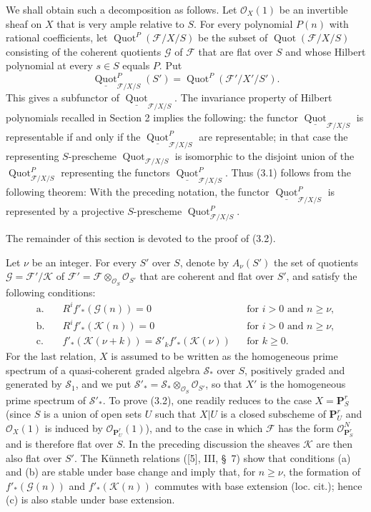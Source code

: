 We shall obtain such a decomposition as follows. Let $\mathcal O_X(1)$ be an
invertible sheaf on $X$ that is very ample relative to $S$. For every
polynomial $P(n)$ with rational coefficients, let
$\operatorname{Quot}^P(\mathcal F/X/S)$ be the subset of
$\operatorname{Quot}(\mathcal F/X/S)$ consisting of the coherent quotients
$\mathcal G$ of $\mathcal F$ that are flat over $S$ and whose Hilbert
polynomial at every $s\in S$ equals $P$. Put
\[
\underline{\operatorname{Quot}}^P_{\mathcal F/X/S}(S')
=\operatorname{Quot}^P(\mathcal F'/X'/S').
\]
This gives a subfunctor of
$\underline{\operatorname{Quot}}_{\mathcal F/X/S}$. The invariance property of
Hilbert polynomials recalled in Section 2 implies the following: the functor
$\underline{\operatorname{Quot}}_{\mathcal F/X/S}$ is representable if and
only if the $\underline{\operatorname{Quot}}^P_{\mathcal F/X/S}$ are
representable; in that case the representing $S$-prescheme
$\operatorname{Quot}_{\mathcal F/X/S}$ is isomorphic to the disjoint union of
the $\operatorname{Quot}^P_{\mathcal F/X/S}$ representing the functors
$\underline{\operatorname{Quot}}^P_{\mathcal F/X/S}$. Thus (3.1) follows from
the following theorem:
 With the preceding notation, the functor
$\underline{\operatorname{Quot}}^P_{\mathcal F/X/S}$ is represented by a
projective $S$-prescheme $\operatorname{Quot}^P_{\mathcal F/X/S}$.

The remainder of this section is devoted to the proof of (3.2).

Let $\nu$ be an integer. For every $S'$ over $S$, denote by $A_\nu(S')$ the
set of quotients $\mathcal G=\mathcal F'/\mathcal K$ of
$\mathcal F'=\mathcal F\otimes_{\mathcal O_S}\mathcal O_{S'}$ that are
coherent and flat over $S'$, and satisfy the following conditions:
\begin{align*}
\text{a.}\quad &R^if'_*(\mathcal G(n))=0 &&\text{for $i>0$ and $n\geq\nu$},\\
\text{b.}\quad &R^if'_*(\mathcal K(n))=0 &&\text{for $i>0$ and $n\geq\nu$},\\
\text{c.}\quad &f'_*(\mathcal K(\nu+k))
=\mathcal S'_k f'_*(\mathcal K(\nu)) &&\text{for $k\geq0$}.
\end{align*}
For the last relation, $X$ is assumed to be written as the homogeneous prime
spectrum of a quasi-coherent graded algebra $\mathcal S_*$ over $S$, positively
graded and generated by $\mathcal S_1$, and we put
$\mathcal S'_* =\mathcal S_*\otimes_{\mathcal O_S}\mathcal O_{S'}$, so that
$X'$ is the homogeneous prime spectrum of $\mathcal S'_*$. To prove (3.2), one
readily reduces to the case $X=\mathbf P^r_S$ (since $S$ is a union of open
sets $U$ such that $X|U$ is a closed subscheme of $\mathbf P^r_U$ and
$\mathcal O_X(1)$ is induced by $\mathcal O_{\mathbf P^r_U}(1)$), and to the
case in which $\mathcal F$ has the form
$\mathcal O_{\mathbf P^r_S}^{N}$ and is therefore flat over $S$. In the
preceding discussion the sheaves $\mathcal K$ are then also flat over $S'$.
The Künneth relations ([5], III, \S~7) show that conditions (a) and (b) are
stable under base change and imply that, for $n\geq\nu$, the formation of
$f'_*(\mathcal G(n))$ and $f'_*(\mathcal K(n))$ commutes with base extension
(loc. cit.); hence (c) is also stable under base extension.

